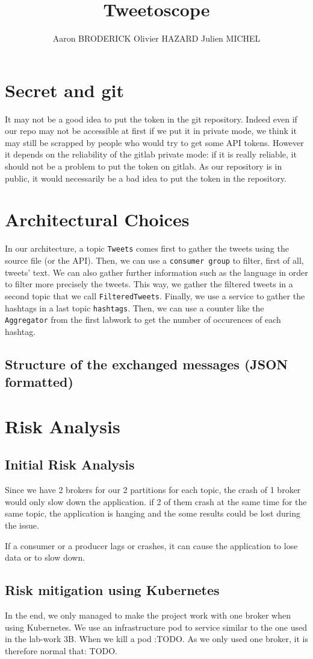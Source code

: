\documentclass[10pt,a4paper]{article}
\author{Aaron BRODERICK Olivier HAZARD Julien MICHEL}
\title{Tweetoscope}
\begin{document}
\maketitle

\section{Secret and git}
\qquad 
It may not be a good idea to put the token in the git repository. Indeed even if our repo may not be accessible at first if we put it in private mode, we think it may still be scrapped by people who would try to get some API tokens. However it depends on the reliability of the gitlab private mode: if it is really reliable, it should not be a problem to put the token on gitlab. As our repository is in public, it would necessarily be a bad idea to put the token in the repository.

\section{Architectural Choices}
\qquad 
In our architecture, a topic \texttt{Tweets} comes first to gather the tweets using the source file (or the API). Then, we can use a \texttt{consumer group} to filter, first of all, tweets' text. We can also gather further information such as the language in order to filter more precisely the tweets. This way, we gather the filtered tweets in a second topic that we call \texttt{FilteredTweets}. Finally, we use a service to gather the hashtags in a last topic \texttt{hashtags}. Then, we can use a counter like the \texttt{Aggregator} from the first labwork to get the number of occurences of each hashtag.

\subsection{Structure of the exchanged messages (JSON formatted)}

\section{Risk Analysis}
\subsection{Initial Risk Analysis}
\qquad Since we have 2 brokers for our 2 partitions for each topic, the crash of 1 broker would only slow down the application. if 2 of them crash at the same time for the same topic, the application is hanging and the some results could be lost during the issue.

If a consumer or a producer lags or crashes, it can cause the application to lose data or to slow down.
\subsection{Risk mitigation using Kubernetes}
\qquad In the end, we only managed to make the project work with one broker when using Kubernetes. We use an infrastructure pod to service similar to the one used in the lab-work 3B. When we kill a pod :TODO. As we only used one broker, it is therefore normal that: TODO.
\end{document}
